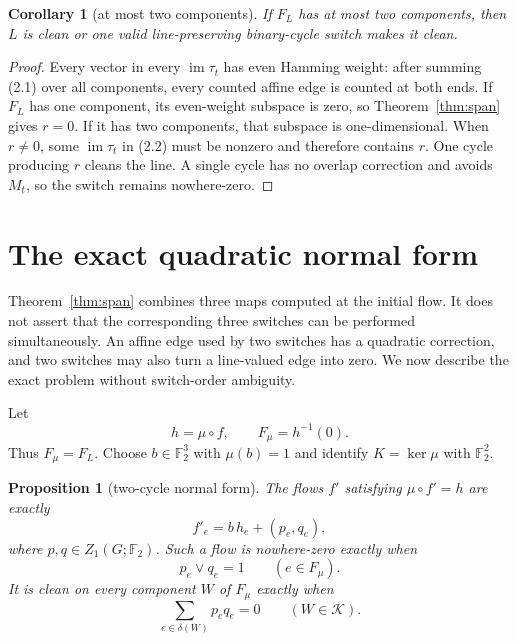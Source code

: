 \documentclass[11pt]{article}
\newtheorem{proposition}[theorem]{Proposition}
\newtheorem{corollary}[theorem]{Corollary}
\theoremstyle{definition}
\theoremstyle{remark}
\newcommand{\F}{\mathbb F}
\newcommand{\Kcal}{\mathcal K}
\newcommand{\im}{\operatorname{im}}
\begin{document}
\begin{corollary}[at most two components]\label{cor:two}
If \(F_L\) has at most two components, then \(L\) is clean or one valid
line-preserving binary-cycle switch makes it clean.
\end{corollary}

\begin{proof}
Every vector in every \(\im\tau_t\) has even Hamming weight: after
summing (2.1) over all components, every counted affine edge is counted
at both ends.  If \(F_L\) has one component, its even-weight subspace is
zero, so Theorem~\ref{thm:span} gives \(r=0\).  If it has two
components, that subspace is one-dimensional.  When \(r\ne0\), some
\(\im\tau_t\) in (2.2) must be nonzero and therefore contains \(r\).
One cycle producing \(r\) cleans the line.  A single cycle has no
overlap correction and avoids \(M_t\), so the switch remains
nowhere-zero.
\end{proof}

\section{The exact quadratic normal form}
\label{sec:normal}

Theorem~\ref{thm:span} combines three maps computed at the initial flow.
It does not assert that the corresponding three switches can be
performed simultaneously.  An affine edge used by two switches has a
quadratic correction, and two switches may also turn a line-valued edge
into zero.  We now describe the exact problem without switch-order
ambiguity.

Let
\[
                      h=\mu\circ f,\qquad F_\mu=h^{-1}(0).
\]
Thus \(F_\mu=F_L\).  Choose \(b\in\F_2^3\) with \(\mu(b)=1\) and
identify \(K=\ker\mu\) with \(\F_2^2\).

\begin{proposition}[two-cycle normal form]\label{prop:normal}
The flows \(f'\) satisfying \(\mu\circ f'=h\) are exactly
\[
                    f'_e=b\,h_e+(p_e,q_e),              \tag{4.1}
\]
where \(p,q\in Z_1(G;\F_2)\).  Such a flow is nowhere-zero exactly when
\[
                    p_e\lor q_e=1\qquad(e\in F_\mu).
                                                        \tag{4.2}
\]
It is clean on every component \(W\) of \(F_\mu\) exactly when
\[
              \sum_{e\in\delta(W)}p_eq_e=0
              \qquad(W\in\Kcal).                        \tag{4.3}
\]
\end{proposition}
\end{document}
